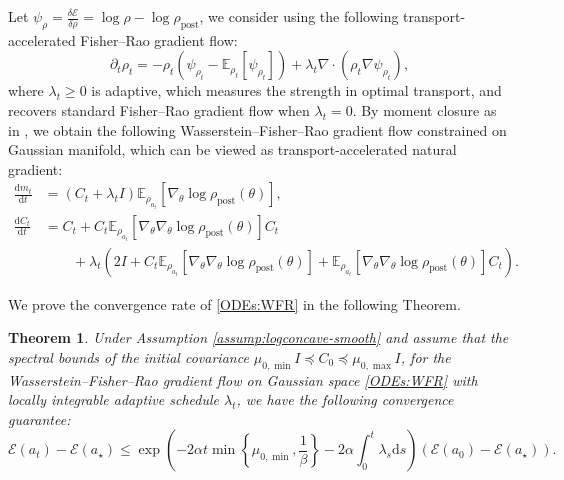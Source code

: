 \documentclass[11pt]{article}
\theoremstyle{plain}
\newtheorem{theorem}{Theorem}[section]
\theoremstyle{definition}
\theoremstyle{remark}
\newcommand{\E}{\mathbb{E}}
\newcommand{\post}{\mathrm{post}}
\newcommand{\dd}{\mathrm{d}}
\begin{document}
Let $\psi_\rho = \frac{\delta \mathcal{E}}{\delta \rho} = \log \rho - \log \rho_\post$, we consider using the following transport-accelerated Fisher--Rao gradient flow:
\begin{equation*}
    \partial_t \rho_t = -\rho_t (\psi_{\rho_t} - \E_{\rho_t} [\psi_{\rho_t}]) + \lambda_t \nabla \cdot (\rho_t \nabla \psi_{\rho_t}),
\end{equation*}
where $\lambda_t \geq 0$ is adaptive, which measures the strength in optimal transport, and recovers standard Fisher--Rao gradient flow when $\lambda_t = 0$. By moment closure as in \cite{chen2023sampling}, we obtain the following Wasserstein--Fisher--Rao gradient flow constrained on Gaussian manifold, which can be viewed as transport-accelerated natural gradient:
\begin{equation}\label{ODEs:WFR}
    \begin{aligned}
        \frac{\dd m_t}{\dd t} &= (C_t + \lambda_t I) \E_{\rho_{a_t}} [\nabla_\theta \log \rho_\post (\theta)], \\
        \frac{\dd C_t}{\dd t} &= C_t + C_t \E_{\rho_{a_t}} [\nabla_\theta \nabla_\theta \log \rho_\post (\theta)] C_t \\
        &\qquad + \lambda_t (2 I + C_t \E_{\rho_{a_t}} [\nabla_\theta \nabla_\theta \log \rho_\post (\theta)] + \E_{\rho_{a_t}} [\nabla_\theta \nabla_\theta \log \rho_\post (\theta)] C_t).
    \end{aligned}
\end{equation}

We prove the convergence rate of \eqref{ODEs:WFR} in the following Theorem.

\begin{theorem}
    Under Assumption \ref{assump:logconcave-smooth} and assume that the spectral bounds of the initial covariance $\mu_{0, \min} I \preceq C_0 \preceq \mu_{0, \max} I$, for the Wasserstein--Fisher--Rao gradient flow on Gaussian space \eqref{ODEs:WFR} with locally integrable adaptive schedule $\lambda_t$, we have the following convergence guarantee:
    \begin{equation*}
        \mathcal{E} (a_t) - \mathcal{E} (a_\star) \leq \exp \left( -2\alpha t \min \left\{ \mu_{0, \min}, \frac{1}{\beta} \right\} - 2\alpha \int_0^t \lambda_s \dd s \right) (\mathcal{E} (a_0) - \mathcal{E} (a_\star)).
    \end{equation*}
\end{theorem}
\end{document}
